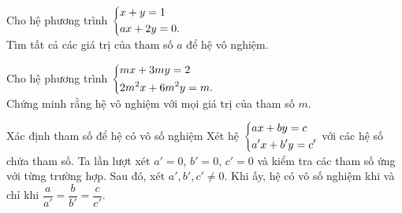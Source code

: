 \begin{vd}
	Cho hệ phương trình $\left\{\begin{aligned}&x + y = 1\\&ax + 2y = 0.\end{aligned}\right.$\\
	Tìm tất cả các giá trị của tham số $a$ để hệ vô nghiệm.
\end{vd}

\begin{vd}
	Cho hệ phương trình $\left\{\begin{aligned}&mx + 3my = 2\\&2m^2x + 6m^2y = m.\end{aligned}\right.$ \\
	Chứng minh rằng hệ vô nghiệm với mọi giá trị của tham số $m$.
\end{vd}

\begin{dang}{Xác định tham số để hệ có vô số nghiệm}
	Xét hệ $\left\{\begin{aligned}&ax + by = c\\&a'x + b'y = c'\\\end{aligned}\right.$ với các hệ số chứa tham số. Ta lần lượt xét $a' = 0$, $b' = 0$, $c' = 0$ và kiểm tra các tham số ứng với từng trường hợp. Sau đó, xét $a', b', c' \ne 0$. Khi ấy, hệ có vô số nghiệm khi và chỉ khi $\dfrac{a}{a'} = \dfrac{b}{b'} = \dfrac{c}{c'}$.
	
\end{dang}


